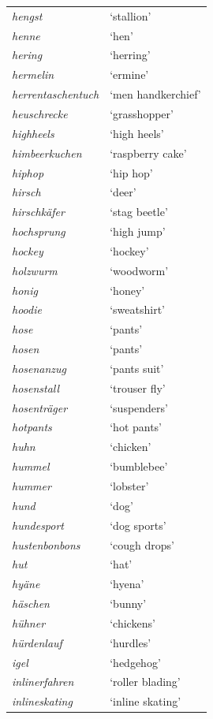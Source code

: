\begin{longtable}{ll}
\textit{hengst} & `stallion' \\
\textit{henne} & `hen' \\
\textit{hering} & `herring' \\
\textit{hermelin} & `ermine' \\
\textit{herrentaschentuch} & `men handkerchief' \\
\textit{heuschrecke} & `grasshopper' \\
\textit{highheels} & `high heels' \\
\textit{himbeerkuchen} & `raspberry cake' \\
\textit{hiphop} & `hip hop' \\
\textit{hirsch} & `deer' \\
\textit{hirschkäfer} & `stag beetle' \\
\textit{hochsprung} & `high jump' \\
\textit{hockey} & `hockey' \\
\textit{holzwurm} & `woodworm' \\
\textit{honig} & `honey' \\
\textit{hoodie} & `sweatshirt' \\
\textit{hose} & `pants' \\
\textit{hosen} & `pants' \\
\textit{hosenanzug} & `pants suit' \\
\textit{hosenstall} & `trouser fly' \\
\textit{hosenträger} & `suspenders' \\
\textit{hotpants} & `hot pants' \\
\textit{huhn} & `chicken' \\
\textit{hummel} & `bumblebee' \\
\textit{hummer} & `lobster' \\
\textit{hund} & `dog' \\
\textit{hundesport} & `dog sports' \\
\textit{hustenbonbons} & `cough drops' \\
\textit{hut} & `hat' \\
\textit{hyäne} & `hyena' \\
\textit{häschen} & `bunny' \\
\textit{hühner} & `chickens' \\
\textit{hürdenlauf} & `hurdles' \\
\textit{igel} & `hedgehog' \\
\textit{inlinerfahren} & `roller blading' \\
\textit{inlineskating} & `inline skating' \\

\end{longtable}
